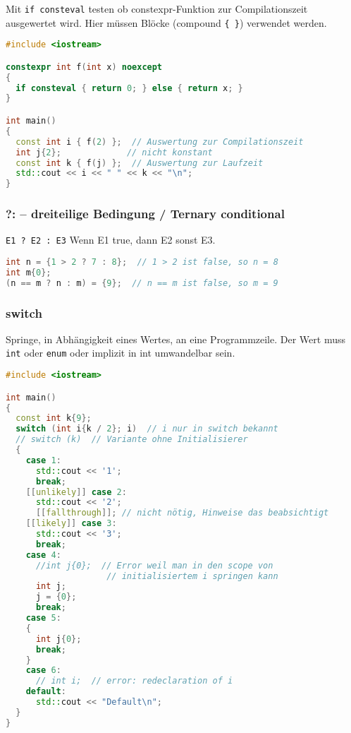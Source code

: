 \documentclass[10pt,twocolumn]{scrartcl}
\begin{document}
Mit \lstinline|if consteval| testen ob constexpr-Funktion zur Compilationszeit
ausgewertet wird. Hier müssen Blöcke (compound \lstinline|{ }|) verwendet
werden.

\begin{lstlisting}[language=C++]
#include <iostream>

constexpr int f(int x) noexcept
{
  if consteval { return 0; } else { return x; }
}

int main()
{
  const int i { f(2) };  // Auswertung zur Compilationszeit
  int j{2};             // nicht konstant
  const int k { f(j) };  // Auswertung zur Laufzeit
  std::cout << i << " " << k << "\n";
}
\end{lstlisting}

\subsubsection{?: -- dreiteilige Bedingung / Ternary conditional}

\lstinline|E1 ? E2 : E3| Wenn E1 true, dann E2 sonst E3.

\begin{lstlisting}[language=C++]
int n = {1 > 2 ? 7 : 8};  // 1 > 2 ist false, so n = 8
int m{0};
(n == m ? n : m) = {9};  // n == m ist false, so m = 9
\end{lstlisting}

\subsubsection{switch}

Springe, in Abhängigkeit eines Wertes, an eine Programmzeile. Der Wert muss
\lstinline|int| oder \lstinline|enum| oder implizit in int umwandelbar
sein.

\begin{lstlisting}[language=C++]
#include <iostream>

int main()
{
  const int k{9};
  switch (int i{k / 2}; i)  // i nur in switch bekannt
  // switch (k)  // Variante ohne Initialisierer
  {
    case 1:
      std::cout << '1';
      break;
    [[unlikely]] case 2:
      std::cout << '2';
      [[fallthrough]]; // nicht nötig, Hinweise das beabsichtigt
    [[likely]] case 3:
      std::cout << '3';
      break;
    case 4:
      //int j{0};  // Error weil man in den scope von
                    // initialisiertem i springen kann
      int j;
      j = {0};
      break;
    case 5:
    {
      int j{0};
      break;
    }
    case 6:
      // int i;  // error: redeclaration of i
    default:
      std::cout << "Default\n";
  }
}
\end{lstlisting}
\end{document}
